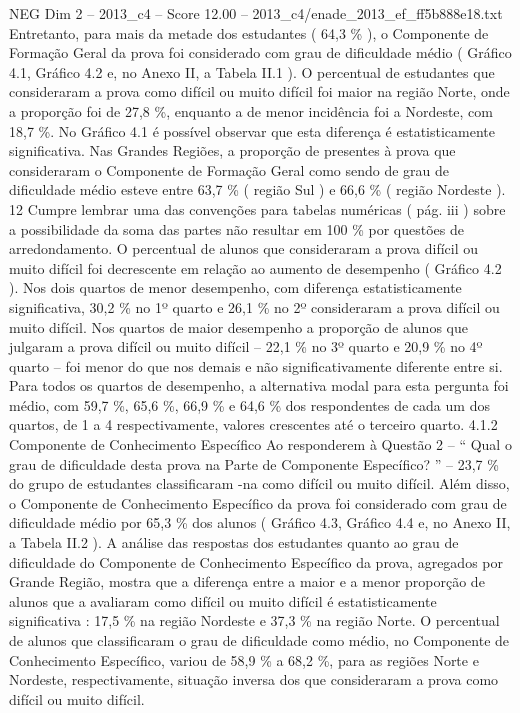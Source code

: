 \begin{textsample}{NEG Dim 2 – 2013\_c4 – Score 12.00 – 2013\_c4/enade\_2013\_ef\_ff5b888e18.txt}
Entretanto, para mais da metade dos estudantes ( 64,3 \% ), o Componente de Formação Geral da prova foi considerado com grau de dificuldade médio ( Gráfico 4.1, Gráfico 4.2 e, no Anexo II, a Tabela II.1 ).
O percentual de estudantes que consideraram a prova como difícil ou muito difícil foi maior na região Norte, onde a proporção foi de 27,8 \%, enquanto a de menor incidência foi a Nordeste, com 18,7 \%.
No Gráfico 4.1 é possível observar que esta diferença é estatisticamente significativa.
Nas Grandes Regiões, a proporção de presentes à prova que consideraram o Componente de Formação Geral como sendo de grau de dificuldade médio esteve entre 63,7 \% ( região Sul ) e 66,6 \% ( região Nordeste ). 12 Cumpre lembrar uma das convenções para tabelas numéricas ( pág. iii ) sobre a possibilidade da soma das partes não resultar em 100 \% por questões de arredondamento.
O percentual de alunos que consideraram a prova difícil ou muito difícil foi decrescente em relação ao aumento de desempenho ( Gráfico 4.2 ).
Nos dois quartos de menor desempenho, com diferença estatisticamente significativa, 30,2 \% no 1º quarto e 26,1 \% no 2º consideraram a prova difícil ou muito difícil.
Nos quartos de maior desempenho a proporção de alunos que julgaram a prova difícil ou muito difícil – 22,1 \% no 3º quarto e 20,9 \% no 4º quarto – foi menor do que nos demais e não significativamente diferente entre si.
Para todos os quartos de desempenho, a alternativa modal para esta pergunta foi médio, com 59,7 \%, 65,6 \%, 66,9 \% e 64,6 \% dos respondentes de cada um dos quartos, de 1 a 4 respectivamente, valores crescentes até o terceiro quarto. 4.1.2 Componente de Conhecimento Específico Ao responderem à Questão 2 – “ Qual o grau de dificuldade desta prova na Parte de Componente Específico? ” – 23,7 \% do grupo de estudantes classificaram -na como difícil ou muito difícil.
Além disso, o Componente de Conhecimento Específico da prova foi considerado com grau de dificuldade médio por 65,3 \% dos alunos ( Gráfico 4.3, Gráfico 4.4 e, no Anexo II, a Tabela II.2 ).
A análise das respostas dos estudantes quanto ao grau de dificuldade do Componente de Conhecimento Específico da prova, agregados por Grande Região, mostra que a diferença entre a maior e a menor proporção de alunos que a avaliaram como difícil ou muito difícil é estatisticamente significativa : 17,5 \% na região Nordeste e 37,3 \% na região Norte.
O percentual de alunos que classificaram o grau de dificuldade como médio, no Componente de Conhecimento Específico, variou de 58,9 \% a 68,2 \%, para as regiões Norte e Nordeste, respectivamente, situação inversa dos que consideraram a prova como difícil ou muito difícil.

\end{textsample}

